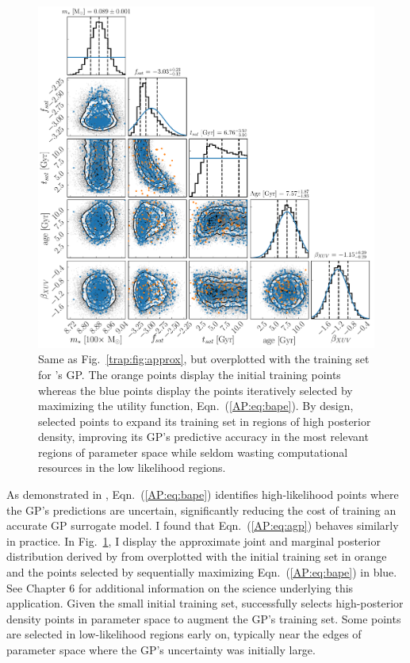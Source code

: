 \begin{figure}
	\includegraphics[width=\textwidth]{points.pdf}
   \caption{Same as Fig.~\ref{trap:fig:approx}, but overplotted with the training set for \approxposterior's GP. The orange points display the initial training points whereas the blue points display the points iteratively selected by maximizing the \citet{Kandasamy2017} utility function, Eqn.~(\ref{AP:eq:bape}). By design, \approxposterior selected points to expand its training set in regions of high posterior density, improving its GP's predictive accuracy in the most relevant regions of parameter space while seldom wasting computational resources in the low likelihood regions.}%
    \label{AP:fig:points}%
\end{figure}

As demonstrated in \citet{Kandasamy2017}, Eqn.~(\ref{AP:eq:bape}) identifies high-likelihood points where the GP's predictions are uncertain, significantly reducing the cost of training an accurate GP surrogate model. I found that Eqn.~(\ref{AP:eq:agp}) behaves similarly in practice. In Fig.~\ref{AP:fig:points}, I display the approximate joint and marginal posterior distribution derived by \approxposterior from \citet{Fleming2020} overplotted with the initial training set in orange and the points selected by sequentially maximizing Eqn.~(\ref{AP:eq:bape}) in blue. See Chapter 6 for additional information on the science underlying this application. Given the small initial training set, \approxposterior successfully selects high-posterior density points in parameter space to augment the GP's training set. Some points are selected in low-likelihood regions early on, typically near the edges of parameter space where the GP's uncertainty was initially large.

